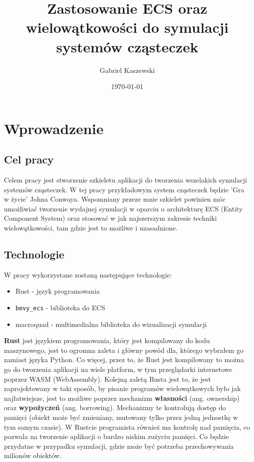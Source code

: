 \documentclass[11pt]{article}
\title{ Zastosowanie ECS oraz wielowątkowości do symulacji systemów cząsteczek }
\author{ Gabriel Kaszewski }
\date{\today}
\begin{document}
\maketitle	
\pagebreak


\section{Wprowadzenie}

\subsection{Cel pracy}
Celem pracy jest stworzenie szkieletu aplikacji do tworzenia wszelakich symulacji systemów cząsteczek.
W tej pracy przykładowym system cząsteczek będzie 'Gra w życie' Johna Conwaya. Wspomniany przeze mnie szkielet powinien
móc umożliwiać tworzenie wydajnej symulacji w oparciu o architekturę ECS (Entity Component System) oraz stosować
w jak najszerszym zakresie techniki wielowątkowości, tam gdzie jest to możliwe i uzasadnione.

\subsection{Technologie}
W pracy wykorzystane zostaną następujące technologie:
\begin{itemize}
    \item Rust - język programowania
    \item \texttt{bevy\_ecs} - biblioteka do ECS
    \item macroquad - multimedialna biblioteka do wizualizacji symulacji
\end{itemize}

\textbf{Rust} jest językiem programowania, który jest kompilowany do kodu maszynowego, jest to ogromna zaleta
i główny powód dla, którego wybrałem go zamiast języka Python. Co więcej, przez to, że Rust jest kompilowany to
można go do tworzenia aplikacji na wiele platform, w tym przeglądarki internetowe poprzez WASM (WebAssembly).
Kolejną zaletą Rusta jest to, że jest zaprojektowany w taki sposób, by pisanie programów wielowątkowych było
jak najłatwiejsze, jest to możliwe poprzez mechanizm \textbf{własności} (ang. ownership) oraz \textbf{wypożyczeń}
(ang. borrowing). Mechanizmy te kontrolują dostęp do pamięci (obiekt może być zmieniany, mutowany tylko przez jedną jednostkę w tym samym czasie).
W Rustcie programista również ma kontrolę nad pamięcia, co pozwala na tworzenie aplikacji o bardzo niskim zużyciu pamięci.
Co będzie przydatne w przypadku symulacji, gdzie może być potrzeba przechowywania milionów obiektów.
\end{document}
